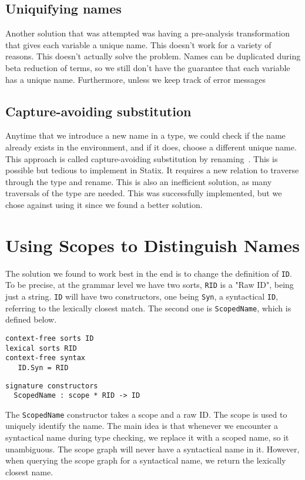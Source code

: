 \subsection{Uniquifying names}

Another solution that was attempted was having a pre-analysis transformation that gives each variable a unique name. This doesn't work for a variety of reasons. This doesn't actually solve the problem. Names can be duplicated during beta reduction of terms, so we still don't have the guarantee that each variable has a unique name. Furthermore, unless we keep track of error messages 

\subsection{Capture-avoiding substitution}

Anytime that we introduce a new name in a type, we could check if the name already exists in the environment, and if it does, choose a different unique name. This approach is called capture-avoiding substitution by renaming~\cite{capture_avoiding_sub}. This is possible but tedious to implement in Statix. It requires a new relation to traverse through the type and rename. This is also an inefficient solution, as many traversals of the type are needed. This was successfully implemented, but we chose against using it since we found a better solution.

\section{Using Scopes to Distinguish Names}
\label{scopes_for_names}

The solution we found to work best in the end is to change the definition of \verb|ID|. To be precise, at the grammar level we have two sorts, \verb|RID| is a "Raw ID", being just a string. \verb|ID| will have two constructors, one being \verb|Syn|, a syntactical \verb|ID|, referring to the lexically closest match. The second one is \verb|ScopedName|, which is defined below.

\begin{lstlisting}
context-free sorts ID
lexical sorts RID
context-free syntax
   ID.Syn = RID
\end{lstlisting}
\begin{lstlisting}
signature constructors
  ScopedName : scope * RID -> ID
\end{lstlisting}

The \verb|ScopedName| constructor takes a scope and a raw ID. The scope is used to uniquely identify the name. The main idea is that whenever we encounter a syntactical name during type checking, we replace it with a scoped name, so it unambiguous. The scope graph will never have a syntactical name in it. However, when querying the scope graph for a syntactical name, we return the lexically closest name.

